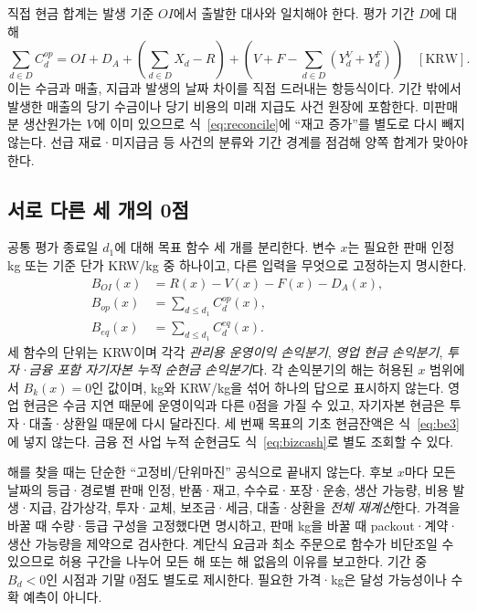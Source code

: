 \documentclass[11pt,a4paper]{article}
\begin{document}
직접 현금 합계는 발생 기준 $OI$에서 출발한 대사와 일치해야 한다. 평가 기간 $D$에 대해
\begin{equation}
\sum_{d\in D} C_d^{op}=OI+D_A+
\left(\sum_{d\in D}X_d-R\right)+
\left(V+F-\sum_{d\in D}(Y_d^V+Y_d^F)\right)\quad[\mathrm{KRW}].\label{eq:reconcile}
\end{equation}
이는 수금과 매출, 지급과 발생의 날짜 차이를 직접 드러내는 항등식이다. 기간 밖에서 발생한 매출의 당기 수금이나 당기 비용의 미래 지급도 사건 원장에 포함한다. 미판매분 생산원가는 $V$에 이미 있으므로 식~\eqref{eq:reconcile}에 ``재고 증가''를 별도로 다시 빼지 않는다. 선급 재료·미지급금 등 사건의 분류와 기간 경계를 점검해 양쪽 합계가 맞아야 한다.

\subsection{서로 다른 세 개의 0점}
공통 평가 종료일 $d_1$에 대해 목표 함수 세 개를 분리한다. 변수 $x$는 필요한 판매 인정 kg 또는 기준 단가 KRW/kg 중 하나이고, 다른 입력을 무엇으로 고정하는지 명시한다.
\begin{align}
B_{OI}(x)&=R(x)-V(x)-F(x)-D_A(x),\label{eq:be1}\\
B_{op}(x)&=\sum_{d\leq d_1}C_d^{op}(x),\label{eq:be2}\\
B_{eq}(x)&=\sum_{d\leq d_1}C_d^{eq}(x).\label{eq:be3}
\end{align}
세 함수의 단위는 KRW이며 각각 \emph{관리용 운영이익 손익분기}, \emph{영업 현금 손익분기}, \emph{투자·금융 포함 자기자본 누적 순현금 손익분기}다. 각 손익분기의 해는 허용된 $x$ 범위에서 $B_k(x)=0$인 값이며, kg와 KRW/kg을 섞어 하나의 답으로 표시하지 않는다. 영업 현금은 수금 지연 때문에 운영이익과 다른 0점을 가질 수 있고, 자기자본 현금은 투자·대출·상환일 때문에 다시 달라진다. 세 번째 목표의 기초 현금잔액은 식~\eqref{eq:be3}에 넣지 않는다. 금융 전 사업 누적 순현금도 식~\eqref{eq:bizcash}로 별도 조회할 수 있다.

해를 찾을 때는 단순한 ``고정비/단위마진'' 공식으로 끝내지 않는다. 후보 $x$마다 모든 날짜의 등급·경로별 판매 인정, 반품·재고, 수수료·포장·운송, 생산 가능량, 비용 발생·지급, 감가상각, 투자·교체, 보조금·세금, 대출·상환을 \emph{전체 재계산}한다. 가격을 바꿀 때 수량·등급 구성을 고정했다면 명시하고, 판매 kg을 바꿀 때 packout·계약·생산 가능량을 제약으로 검사한다. 계단식 요금과 최소 주문으로 함수가 비단조일 수 있으므로 허용 구간을 나누어 모든 해 또는 해 없음의 이유를 보고한다. 기간 중 $B_d<0$인 시점과 기말 0점도 별도로 제시한다. 필요한 가격·kg은 달성 가능성이나 수확 예측이 아니다.
\end{document}
